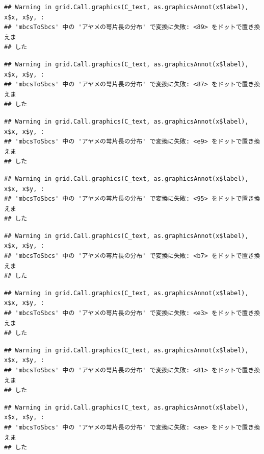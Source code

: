 \documentclass[
]{book}
\begin{document}
\begin{verbatim}
## Warning in grid.Call.graphics(C_text, as.graphicsAnnot(x$label), x$x, x$y, :
## 'mbcsToSbcs' 中の 'アヤメの萼片長の分布' で変換に失敗: <89> をドットで置き換えま
## した
\end{verbatim}

\begin{verbatim}
## Warning in grid.Call.graphics(C_text, as.graphicsAnnot(x$label), x$x, x$y, :
## 'mbcsToSbcs' 中の 'アヤメの萼片長の分布' で変換に失敗: <87> をドットで置き換えま
## した
\end{verbatim}

\begin{verbatim}
## Warning in grid.Call.graphics(C_text, as.graphicsAnnot(x$label), x$x, x$y, :
## 'mbcsToSbcs' 中の 'アヤメの萼片長の分布' で変換に失敗: <e9> をドットで置き換えま
## した
\end{verbatim}

\begin{verbatim}
## Warning in grid.Call.graphics(C_text, as.graphicsAnnot(x$label), x$x, x$y, :
## 'mbcsToSbcs' 中の 'アヤメの萼片長の分布' で変換に失敗: <95> をドットで置き換えま
## した
\end{verbatim}

\begin{verbatim}
## Warning in grid.Call.graphics(C_text, as.graphicsAnnot(x$label), x$x, x$y, :
## 'mbcsToSbcs' 中の 'アヤメの萼片長の分布' で変換に失敗: <b7> をドットで置き換えま
## した
\end{verbatim}

\begin{verbatim}
## Warning in grid.Call.graphics(C_text, as.graphicsAnnot(x$label), x$x, x$y, :
## 'mbcsToSbcs' 中の 'アヤメの萼片長の分布' で変換に失敗: <e3> をドットで置き換えま
## した
\end{verbatim}

\begin{verbatim}
## Warning in grid.Call.graphics(C_text, as.graphicsAnnot(x$label), x$x, x$y, :
## 'mbcsToSbcs' 中の 'アヤメの萼片長の分布' で変換に失敗: <81> をドットで置き換えま
## した
\end{verbatim}

\begin{verbatim}
## Warning in grid.Call.graphics(C_text, as.graphicsAnnot(x$label), x$x, x$y, :
## 'mbcsToSbcs' 中の 'アヤメの萼片長の分布' で変換に失敗: <ae> をドットで置き換えま
## した
\end{verbatim}
\end{document}
